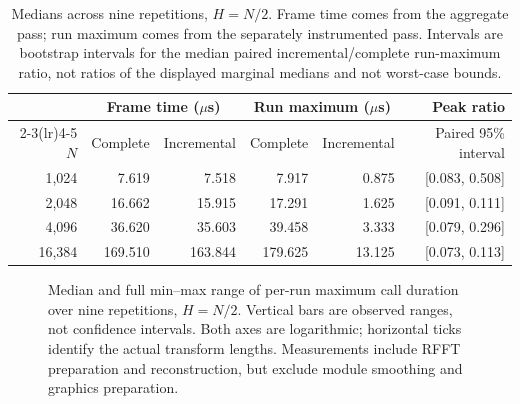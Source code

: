 \documentclass[11pt,letterpaper]{article}
\begin{document}
\begin{table}[tb]
\centering\small
\begin{tabular}{@{}rrr rrr@{}}
\toprule
& \multicolumn{2}{c}{Frame time ($\mu$s)} & \multicolumn{2}{c}{Run maximum ($\mu$s)} & Peak ratio \\
\cmidrule(lr){2-3}\cmidrule(lr){4-5}
$N$ & Complete & Incremental & Complete & Incremental & Paired 95\% interval \\
\midrule
1,024 & 7.619 & 7.518 & 7.917 & 0.875 & [0.083, 0.508] \\
2,048 & 16.662 & 15.915 & 17.291 & 1.625 & [0.091, 0.111] \\
4,096 & 36.620 & 35.603 & 39.458 & 3.333 & [0.079, 0.296] \\
16,384 & 169.510 & 163.844 & 179.625 & 13.125 & [0.073, 0.113] \\
\bottomrule
\end{tabular}
\caption{Medians across nine repetitions, $H=N/2$. Frame time comes from the aggregate pass; run maximum comes from the separately instrumented pass. Intervals are bootstrap intervals for the median paired incremental/complete run-maximum ratio, not ratios of the displayed marginal medians and not worst-case bounds.}
\label{tab:timing}
\end{table}

\begin{figure}[tb]
\centering
{}
\caption{Median and full min--max range of per-run maximum call duration over nine repetitions, $H=N/2$. Vertical bars are observed ranges, not confidence intervals. Both axes are logarithmic; horizontal ticks identify the actual transform lengths. Measurements include RFFT preparation and reconstruction, but exclude module smoothing and graphics preparation.}
\label{fig:peaks}
\end{figure}
\end{document}
